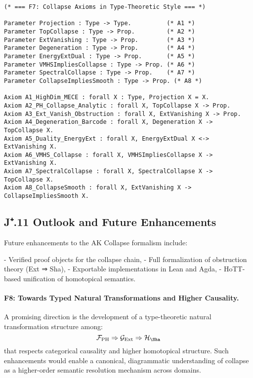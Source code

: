 \begin{lstlisting}[language=Coq, caption=Collapse Axioms as Type-Theoretic Statements]
(* === F7: Collapse Axioms in Type-Theoretic Style === *)

Parameter Projection : Type -> Type.          (* A1 *)
Parameter TopCollapse : Type -> Prop.         (* A2 *)
Parameter ExtVanishing : Type -> Prop.        (* A3 *)
Parameter Degeneration : Type -> Prop.        (* A4 *)
Parameter EnergyExtDual : Type -> Prop.       (* A5 *)
Parameter VMHSImpliesCollapse : Type -> Prop. (* A6 *)
Parameter SpectralCollapse : Type -> Prop.    (* A7 *)
Parameter CollapseImpliesSmooth : Type -> Prop. (* A8 *)

Axiom A1_HighDim_MECE : forall X : Type, Projection X = X.
Axiom A2_PH_Collapse_Analytic : forall X, TopCollapse X -> Prop.
Axiom A3_Ext_Vanish_Obstruction : forall X, ExtVanishing X -> Prop.
Axiom A4_Degeneration_Barcode : forall X, Degeneration X -> TopCollapse X.
Axiom A5_Duality_EnergyExt : forall X, EnergyExtDual X <-> ExtVanishing X.
Axiom A6_VMHS_Collapse : forall X, VMHSImpliesCollapse X -> ExtVanishing X.
Axiom A7_SpectralCollapse : forall X, SpectralCollapse X -> TopCollapse X.
Axiom A8_CollapseSmooth : forall X, ExtVanishing X -> CollapseImpliesSmooth X.
\end{lstlisting}

\subsection*{J⁺.11 Outlook and Future Enhancements}

Future enhancements to the AK Collapse formalism include:

- Verified proof objects for the collapse chain,
- Full formalization of obstruction theory (Ext ⇒ Sha),
- Exportable implementations in Lean and Agda,
- HoTT-based unification of homotopical semantics.

\paragraph{F8: Towards Typed Natural Transformations and Higher Causality.}

A promising direction is the development of a type-theoretic  
natural transformation structure among:
\[
\mathcal{F}_{\text{PH}} \Rightarrow \mathcal{G}_{\text{Ext}} \Rightarrow \mathcal{H}_{\Sha}
\]
that respects categorical causality and higher homotopical structure.  
Such enhancements would enable a canonical, diagrammatic understanding  
of collapse as a higher-order semantic resolution mechanism across domains.

